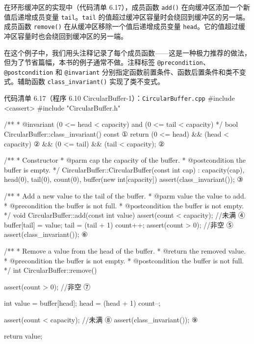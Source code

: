 在环形缓冲区的实现中（代码清单 6.17），成员函数 \texttt{add()} 在向缓冲区添加一个新值后递增成员变量 \texttt{tail}。\texttt{tail} 的值超过缓冲区容量时会绕回到缓冲区的另一端。成员函数 \texttt{remove()} 在从缓冲区移除一个值后递增成员变量 \texttt{head}。它的值超过缓冲区容量时也会绕回到缓冲区的另一端。

在这个例子中，我们用头注释记录了每个成员函数——这是一种极力推荐的做法，但为了节省篇幅，本书的例子通常不做。注释标签 \texttt{@precondition}、\texttt{@postcondition} 和 \texttt{@invariant} 分别指定函数前置条件、函数后置条件和类不变式。辅助函数 \texttt{class\_\allowbreak{}invariant(\allowbreak{})\allowbreak{}} 实现了类不变式。

\begin{codeboxt}{代码清单 6.17（程序 6.10 CircularBuffer-1）：\texttt{Circular\allowbreak{}Buffer.\allowbreak{}cpp}}
#include <cassert>
#include "CircularBuffer.h"

/**
 * @invariant (0 <= head < capacity) and (0 <= tail < capacity)
 */
bool CircularBuffer::class_invariant() const     ①
{
    return (0 <= head) && (head < capacity)      ②
        && (0 <= tail) && (tail < capacity);     ②
}

/**
 * Constructor
 * @parm cap the capacity of the buffer.
 * @postcondition the buffer is empty.
 */
CircularBuffer::CircularBuffer(const int cap)
    : capacity(cap), head(0), tail(0), count(0),
      buffer(new int[capacity])
{
    assert(class_invariant());                   ③
}

/**
 * Add a new value to the tail of the buffer.
 * @parm value the value to add.
 * @precondition the buffer is not full.
 * @postcondition the buffer is not empty.
 */
void CircularBuffer::add(const int value)
{
    assert(count < capacity);  //未满        ④
    buffer[tail] = value;
    tail = (tail + 1)%
    count++;
    assert(count > 0);  //非空              ⑤
    assert(class_invariant());                    ⑥
}

/**
 * Remove a value from the head of the buffer.
 * @return the removed value.
 * @precondition the buffer is not empty.
 * @postcondition the buffer is not full.
 */
int CircularBuffer::remove()
{
    assert(count > 0);  //非空              ⑦

    int value = buffer[head];
    head = (head + 1)%
    count--;

    assert(count < capacity);  //未满        ⑧
    assert(class_invariant());                    ⑨

    return value;
}
\end{codeboxt}
